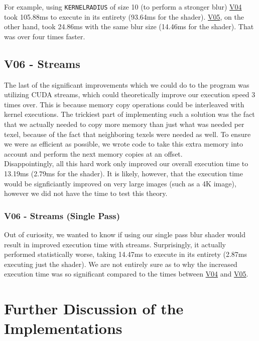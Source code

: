 \documentclass[10pt,journal,compsoc]{IEEEtran}
\def\code#1{\texttt{#1}}
\begin{document}
\noindent For example, using \code{KERNELRADIUS} of size 10 (to perform a stronger blur) \hyperref[sec:V04]{V04} took 105.88ms to execute in its entirety (93.64ms for the shader). \hyperref[sec:V05]{V05}, on the other hand, took 24.86ms with the same blur size (14.46ms for the shader). That was over four times faster. \\


\subsection{V06 - Streams}
\label{sec:V06}

\noindent The last of the significant improvements which we could do to the program was utilizing CUDA streams, which could theoretically improve our execution speed 3 times over. This is because memory copy operations could be interleaved with kernel executions. The trickiest part of implementing such a solution was the fact that we actually needed to copy more memory than just what was needed per texel, because of the fact that neighboring texels were needed as well. To ensure we were as efficient as possible, we wrote code to take this extra memory into account and perform the next memory copies at an offset.\\

\noindent Disappointingly, all this hard work only improved our overall execution time to 13.19ms (2.79ms for the shader). It is likely, however, that the execution time would be signficiantly improved on very large images (such as a 4K image), however we did not have the time to test this theory.


\subsubsection{V06 - Streams (Single Pass)}

\noindent Out of curiosity, we wanted to know if using our single pass blur shader would result in improved execution time with streams. Surprisingly, it actually performed statistically worse, taking 14.47ms to execute in its entirety (2.87ms executing just the shader). We are not entirely sure as to why the increased execution time was so significant compared to the times between \hyperref[sec:V04]{V04} and \hyperref[sec:V05]{V05}. \\


\section{Further Discussion of the Implementations}
\end{document}

